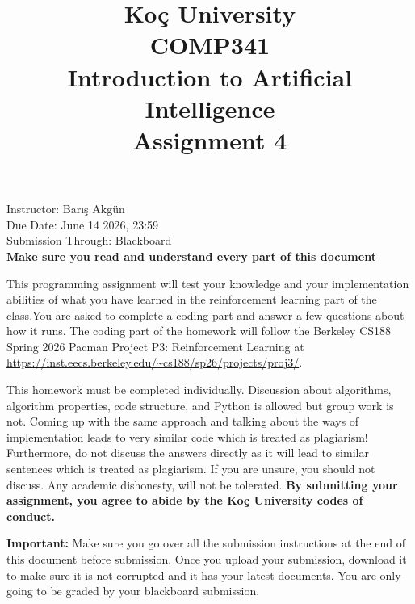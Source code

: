 \documentclass{article}
\newcommand{\instructor}{Bar{\i}\c{s} Akg\"un } %
\newcommand{\courseCode}{COMP341 } %
\newcommand{\courseName}{Introduction to Artificial Intelligence}
\newcommand{\assingmentNum}{4}
\newcommand{\responsibleTA}{None}
\newcommand{\dueDate}{June 14 2026, 23:59}
\newcommand{\submissionType}{Blackboard}
\newcommand{\coursePart}{reinforcement learning }
\newcommand{\additionalInfo}{Relevant Programming Session: None}
\begin{document}
\title{\textbf{Ko\c{c} University \\ \courseCode \\ \courseName \\ Assignment \assingmentNum }}
\date{}

\maketitle

\vspace{-2cm}

\begin{center}
Instructor: \instructor \\
Due Date: \dueDate \\
Submission Through: \submissionType \\
\textbf{Make sure you read and understand every part of this document} \\
\end{center}

This programming assignment will test your knowledge and your implementation
abilities of what you have learned in the \coursePart part of the class.You are asked to complete
a coding part and answer a few questions about how it runs.  The coding part of the homework will follow the
Berkeley CS188 Spring 2026 Pacman Project P3: Reinforcement Learning at \url{https://inst.eecs.berkeley.edu/~cs188/sp26/projects/proj3/}. 

This homework must be completed individually. Discussion about algorithms, algorithm properties, code structure, and Python is
allowed but group work is not. Coming up with the same approach and talking about the ways of implementation
leads to very similar code which is treated as plagiarism! Furthermore, do not discuss the answers directly as it will lead to
similar sentences which is treated as plagiarism. If you are unsure, you should not discuss. Any academic dishonesty, will not be tolerated.
\textbf{By submitting your assignment, you agree to abide by the Ko\c{c} University codes of conduct.}


\textbf{Important:} Make sure you go over all the submission instructions at the end of this document before submission. Once you upload your submission, 
download it to make sure it is not corrupted and it has your latest documents. You are only going to be graded by your blackboard submission. 
\end{document}
